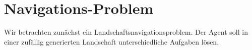 \chapter{Navigations-Problem}\label{sec:NavigationProblem}
Wir betrachten zunächst ein Landschaftsnavigationsproblem. Der Agent soll in einer zufällig generierten Landschaft unterschiedliche Aufgaben lösen.





